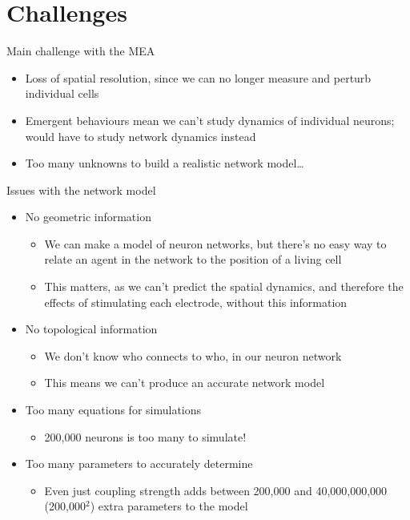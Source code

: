 \documentclass[presentation]{beamer}
\begin{document}
\section{Challenges}
\label{sec:orgdd8bc00}
\begin{frame}[label={sec:orgd6768ce}]{Main challenge with the MEA}
\begin{itemize}
\item Loss of spatial resolution, since we can no longer measure and perturb individual cells
\item Emergent behaviours mean we can't study dynamics of individual neurons; would have to study network dynamics instead
\item Too many unknowns to build a realistic network model\ldots{}
\end{itemize}
\end{frame}

\begin{frame}[label={sec:org7f4b23d}]{Issues with the network model}
\begin{itemize}
\item No geometric information 
\begin{itemize}
\item We can make a model of neuron networks, but there's no easy way to relate an agent in the network to the position of a living cell
\item This matters, as we can't predict the spatial dynamics, and therefore the effects of stimulating each electrode, without this information
\end{itemize}
\item No topological information
\begin{itemize}
\item We don't know who connects to who, in our neuron network
\item This means we can't produce an accurate network model
\end{itemize}
\item Too many equations for simulations
\begin{itemize}
\item 200,000 neurons is too many to simulate!
\end{itemize}
\item Too many parameters to accurately determine
\begin{itemize}
\item Even just coupling strength adds between 200,000 and 40,000,000,000 (200,000\(^{\text{2}}\)) extra parameters to the model
\end{itemize}
\end{itemize}
\end{frame}
\end{document}
